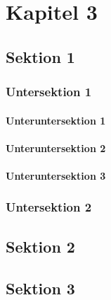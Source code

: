 \chapter{Kapitel 3}
\blindtext

\section{Sektion 1}
\blindtext

\subsection{Untersektion 1}
\blindtext

\subsubsection{Unteruntersektion 1}
\blindtext

\subsubsection{Unteruntersektion 2}
\blindtext

\subsubsection{Unteruntersektion 3}
\blindtext

\subsection{Untersektion 2}
\blindtext

\section{Sektion 2}
\blindtext

\section{Sektion 3}
\blindtext
